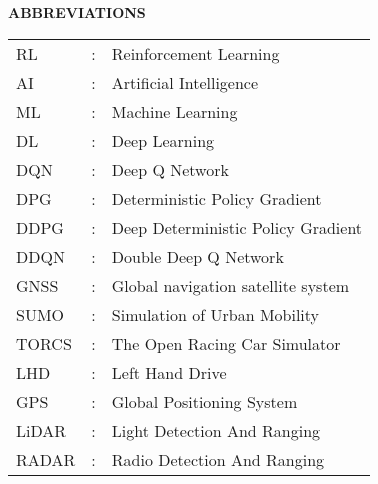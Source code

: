 \begin{center}
\large{\textbf{ABBREVIATIONS}}\\
\vspace{1cm}
\end{center}

\begin{table}[bpht!]
\centering
	\begin{tabular}{lcl}
	RL&:& Reinforcement Learning\\
	AI&:& Artificial Intelligence\\
	ML&:& Machine Learning\\
	DL&:& Deep Learning\\
	DQN&:& Deep Q Network\\
	DPG&:& Deterministic Policy Gradient\\
	DDPG&:& Deep Deterministic Policy Gradient\\
	DDQN&:&Double Deep Q Network\\
	GNSS&:&Global navigation satellite system\\
	SUMO&:& Simulation of Urban Mobility\\
	TORCS&:& The Open Racing Car Simulator\\
	LHD&:& Left Hand Drive\\
	GPS&:& Global Positioning System \\
	LiDAR&:& Light Detection And Ranging\\
	RADAR&:& Radio Detection And Ranging\\
	

	\end{tabular}
\end{table}